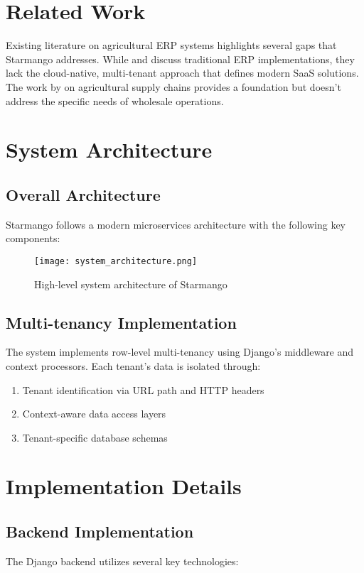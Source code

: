 \documentclass[conference]{IEEEtran}
\begin{document}
\section{Related Work}
Existing literature on agricultural ERP systems highlights several gaps that Starmango addresses. While \cite{ref1} and \cite{ref2} discuss traditional ERP implementations, they lack the cloud-native, multi-tenant approach that defines modern SaaS solutions. The work by \cite{ref3} on agricultural supply chains provides a foundation but doesn't address the specific needs of wholesale operations.

\section{System Architecture}

\subsection{Overall Architecture}
Starmango follows a modern microservices architecture with the following key components:

\begin{figure}[h]
\centering
\texttt{[image: system\_architecture.png]}
\caption{High-level system architecture of Starmango}
\label{fig:architecture}
\end{figure}

\subsection{Multi-tenancy Implementation}
The system implements row-level multi-tenancy using Django's middleware and context processors. Each tenant's data is isolated through:

\begin{enumerate}
    \item Tenant identification via URL path and HTTP headers
    \item Context-aware data access layers
    \item Tenant-specific database schemas
\end{enumerate}

\section{Implementation Details}

\subsection{Backend Implementation}
The Django backend utilizes several key technologies:
\end{document}
